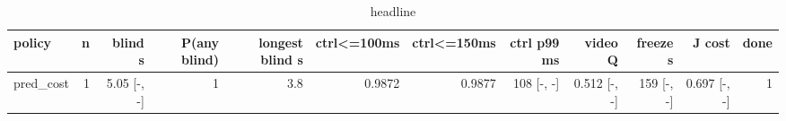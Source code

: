 \begin{table}[t]\centering\small
\begin{tabular}{lrrrrrrrrrrr}\toprule
policy & n & blind s & P(any blind) & longest blind s & ctrl<=100ms & ctrl<=150ms & ctrl p99 ms & video Q & freeze s & J cost & done \\\midrule
pred\_cost & 1 & 5.05 [-, -] & 1 & 3.8 & 0.9872 & 0.9877 & 108 [-, -] & 0.512 [-, -] & 159 [-, -] & 0.697 [-, -] & 1 \\
\bottomrule\end{tabular}\caption{headline}\end{table}
